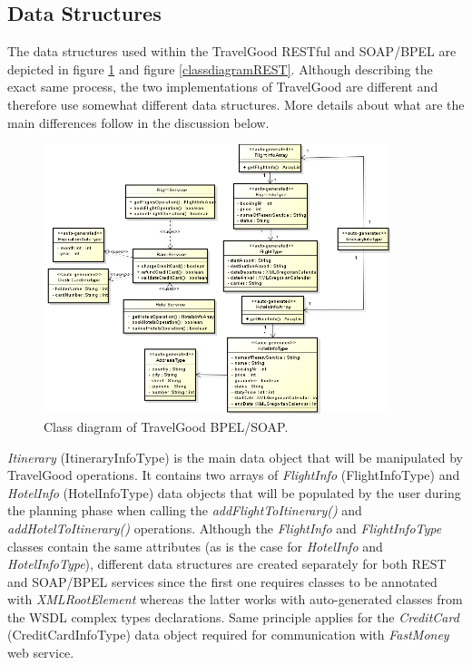 \subsection{Data Structures}
The data structures used within the TravelGood RESTful and SOAP/BPEL are depicted in figure \ref{classdiagramBPEL} and figure \ref{classdiagramREST}. Although describing the exact same process, the two implementations of TravelGood are different and therefore use somewhat different data structures. More details about what are the main differences follow in the discussion below. 

\begin{figure}[H]
\centering
\includegraphics[width=0.9\textwidth]{images/BPEL-SOAP}
\caption{Class diagram of TravelGood BPEL/SOAP.}
\label{classdiagramBPEL}
\end{figure}

\textit{Itinerary} (ItineraryInfoType) is the main data object that will be manipulated by TravelGood operations. It contains two arrays of \textit{FlightInfo} (FlightInfoType) and \textit{HotelInfo} (HotelInfoType) data objects that will be populated by the user during the planning phase when calling the \textit{addFlightToItinerary()} and \textit{addHotelToItinerary()} operations. Although the \textit{FlightInfo} and \textit{FlightInfoType} classes contain the same attributes (as is the case for \textit{HotelInfo} and \textit{HotelInfoType}), different data structures are created separately for both REST and SOAP/BPEL services since the first one requires classes to be annotated with \textit{\@ XMLRootElement} whereas the latter works with auto-generated classes from the WSDL complex types declarations. Same principle applies for the \textit{CreditCard} (CreditCardInfoType) data object required for communication with \textit{FastMoney} web service.

